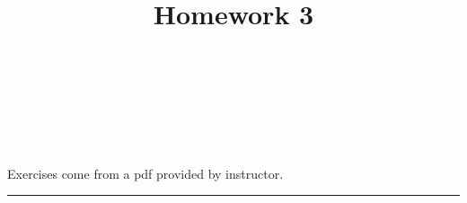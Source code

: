 \documentclass[10pt]{amsart}
\theoremstyle{nonumberplain}
\begin{document}
\pagestyle{empty}

\newcommand{\mline}{\vspace{.2in}\hrule\vspace{.2in}}

\noindent
{} \\
 \\
 \\
 \\

\title{\bf {Homework 3} }


\maketitle
\noindent
Exercises come from a pdf provided by instructor.
\mline
\end{document}
